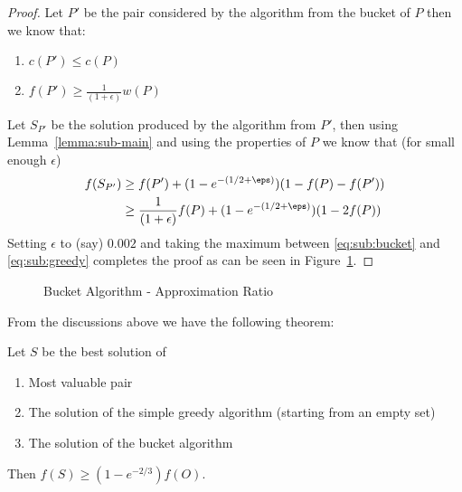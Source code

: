 \begin{proof}
	Let $P'$ be the pair considered by the algorithm from the bucket of $P$ then we know that:
	\begin{enumerate}
		\item $c(P') \leq c(P)$
		\item $f(P') \geq \frac{1}{(1 + \epsilon)}w(P)$
	\end{enumerate}
	Let $S_{P'}$ be the solution produced by the algorithm from $P'$,
	then using Lemma~\ref{lemma:sub-main} and using the properties of $P$ we know that (for small enough $\epsilon$)
	\begin{align}
		f(S_{P'}) & \geq f(P') + (1-e^{-(1/2 + \eps)})(1 - f(P) - f(P'))
		\\ & 
		\geq \frac{1}{(1 + \epsilon)}f(P) + (1-e^{-(1/2 + \eps)})(1 - 2f(P))
		\label{eq:sub:bucket}
	\end{align}
	Setting $\epsilon$ to (say) $0.002$ and taking the maximum between \ref{eq:sub:bucket} and
	\ref{eq:sub:greedy} completes the proof as can be seen in Figure~\ref{fig:sub:bucket}.
\end{proof}

\begin{figure}
	\def\zeta{0.002}
	\caption{
		\label{fig:sub:bucket}
		Bucket Algorithm - Approximation Ratio
	}
\end{figure}

From the discussions above we have the following theorem:

\begin{theorem}
	Let $S$ be the best solution of
	\begin{enumerate}
		\item Most valuable pair
		\item The solution of the simple greedy algorithm (starting from an empty set)
		\item The solution of the bucket algorithm
	\end{enumerate}
	Then $f(S) \geq (1 - e^{-2/3})f(O)$.
\end{theorem}
